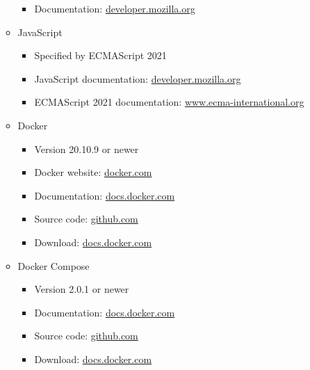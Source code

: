 \documentclass{scrreprt}
\begin{document}
\begin{itemize}
\begin{itemize}
\begin{itemize}
            \item Documentation: \href{https://developer.mozilla.org/en-US/docs/Web/CSS}{developer.mozilla.org}
        
        \end{itemize}

        \item JavaScript
        \begin{itemize}

            \item Specified by ECMAScript 2021
            \item JavaScript documentation: \href{https://developer.mozilla.org/en-US/docs/Web/JavaScript}{developer.mozilla.org}
            \item ECMAScript 2021 documentation: \href{https://www.ecma-international.org/wp-content/uploads/ECMA-262_12th_edition_june_2021.pdf}{www.ecma-international.org}

        \end{itemize}
        
        \item Docker
        \begin{itemize}
        
            \item Version 20.10.9 or newer
            \item Docker website: \href{https://www.docker.com/}{docker.com}
            \item Documentation: \href{https://docs.docker.com/get-started/overview/}{docs.docker.com}
            \item Source code: \href{https://github.com/moby/moby}{github.com}
            \item Download: \href{https://docs.docker.com/get-docker/}{docs.docker.com}
        
        \end{itemize}
        
        \item Docker Compose
        \begin{itemize}
        
            \item Version 2.0.1 or newer
            \item Documentation: \href{https://docs.docker.com/compose/}{docs.docker.com}
            \item Source code: \href{https://github.com/docker/compose}{github.com}
            \item Download: \href{https://docs.docker.com/compose/install/}{docs.docker.com}
        

\end{itemize}
\end{itemize}
\end{itemize}
\end{document}
